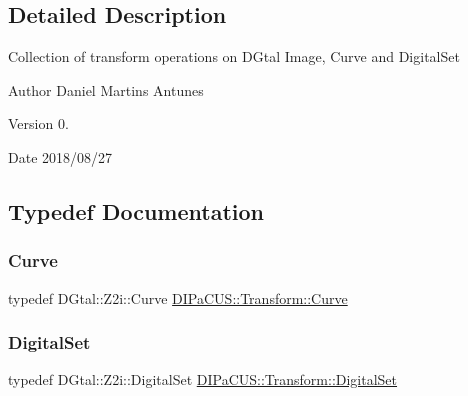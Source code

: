 \subsection{Detailed Description}
Collection of transform operations on D\+Gtal Image, Curve and Digital\+Set

\begin{DoxyAuthor}{Author}
Daniel Martins Antunes 
\end{DoxyAuthor}
\begin{DoxyVersion}{Version}
0. 
\end{DoxyVersion}
\begin{DoxyDate}{Date}
2018/08/27 
\end{DoxyDate}


\subsection{Typedef Documentation}
\mbox{\label{namespaceDIPaCUS_1_1Transform_ae8200b02a170f9d9f68b8d345924b2c3}} 
\subsubsection{\texorpdfstring{Curve}{Curve}}
{\footnotesize\ttfamily typedef D\+Gtal\+::\+Z2i\+::\+Curve \hyperlink{namespaceDIPaCUS_1_1Transform_ae8200b02a170f9d9f68b8d345924b2c3}{D\+I\+Pa\+C\+U\+S\+::\+Transform\+::\+Curve}}

\mbox{\label{namespaceDIPaCUS_1_1Transform_aa5173fa40d34010f28dfcd617f2fd49b}} 
\subsubsection{\texorpdfstring{Digital\+Set}{DigitalSet}}
{\footnotesize\ttfamily typedef D\+Gtal\+::\+Z2i\+::\+Digital\+Set \hyperlink{namespaceDIPaCUS_1_1Transform_aa5173fa40d34010f28dfcd617f2fd49b}{D\+I\+Pa\+C\+U\+S\+::\+Transform\+::\+Digital\+Set}}

\mbox{\label{namespaceDIPaCUS_1_1Transform_a6da009851d50adae6e3e93ce4550cbda}} 
